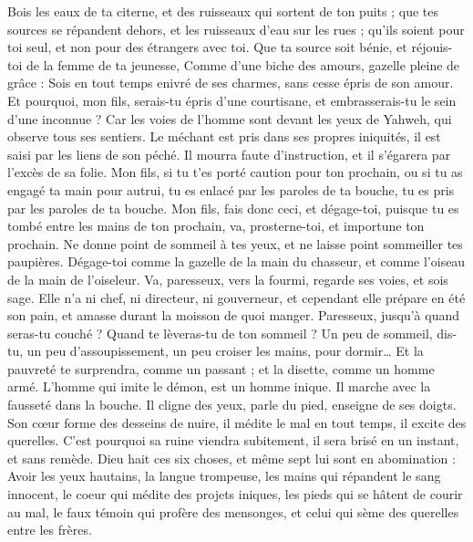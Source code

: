 \begin{multicols}{2}
Bois les eaux de ta citerne, et des ruisseaux qui sortent de ton puits ;
que tes sources se répandent dehors, et les ruisseaux d'eau sur les rues ;
qu'ils soient pour toi seul, et non pour des étrangers avec toi.
Que ta source soit bénie, et réjouis-toi de la femme de ta jeunesse,
Comme d'une biche des amours, gazelle pleine de grâce : Sois en tout temps enivré de ses charmes, sans cesse épris de son amour.
Et pourquoi, mon fils, serais-tu épris d’une courtisane, et embrasserais-tu le sein d’une inconnue ?
Car les voies de l'homme sont devant les yeux de Yahweh, qui observe tous ses sentiers.
Le méchant est pris dans ses propres iniquités, il est saisi par les liens de son péché.
Il mourra faute d'instruction, et il s’égarera  par l’excès de sa folie.
\VerseOne{}Mon fils, si tu t’es porté caution pour ton prochain, ou si tu as engagé ta main pour autrui,
tu es enlacé par les paroles de ta bouche, tu es pris par les paroles de ta bouche.
Mon fils, fais donc ceci, et dégage-toi, puisque tu es tombé entre les mains de ton prochain, va, prosterne-toi, et importune ton prochain.
Ne donne point de sommeil à tes yeux, et ne laisse point sommeiller tes paupières.
Dégage-toi comme la gazelle de la main du chasseur, et comme l'oiseau de la main de l'oiseleur.
Va, paresseux, vers la fourmi, regarde ses voies, et sois sage.
Elle n'a ni chef, ni directeur, ni gouverneur,
et cependant elle prépare en été son pain, et amasse durant la moisson de quoi manger.
Paresseux, jusqu'à quand seras-tu couché ? Quand te lèveras-tu de ton sommeil ?
Un peu de sommeil, dis-tu, un peu d’assoupissement, un peu croiser les mains, pour dormir…
Et la pauvreté te surprendra, comme un passant ; et la disette, comme un homme armé.
L'homme qui imite le démon, est un homme inique. Il marche avec la fausseté dans la bouche.
Il cligne des yeux, parle du pied, enseigne de ses doigts.
Son cœur forme des desseins de nuire, il médite le mal en tout temps, il excite des querelles.
C'est pourquoi sa ruine viendra subitement, il sera brisé en un instant, et sans remède.
Dieu hait ces six choses, et même sept lui sont en abomination :
Avoir les yeux hautains, la langue trompeuse, les mains qui répandent le sang innocent,
le coeur qui médite des projets iniques, les pieds qui se hâtent de courir au mal,
le faux témoin qui profère des mensonges, et celui qui sème des querelles entre les frères.

\end{multicols}
